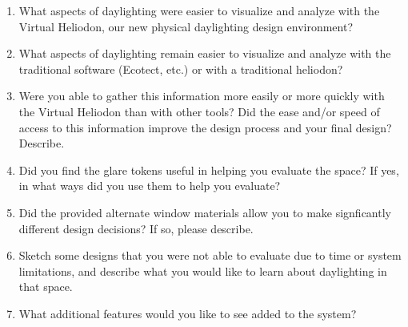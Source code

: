 \documentclass[10pt]{article}
\begin{document}
\begin{enumerate}

\item
What aspects of daylighting were easier to visualize and analyze with
the Virtual Heliodon, our new physical daylighting design environment?

\item
What aspects of daylighting remain easier to visualize and analyze
with the traditional software (Ecotect, etc.) or with a traditional
heliodon?

\item
Were you able to gather this information more easily or more quickly
with the Virtual Heliodon than with other tools?  Did the ease and/or
speed of access to this information improve the design process and
your final design?  Describe.

\item
Did you find the glare tokens useful in helping you evaluate the space?
If yes, in what ways did you use them to help you evaluate?

\item
Did the provided alternate window materials allow you to make signficantly different
design decisions?  If so, please describe.

\item
Sketch some designs that you were not able to evaluate due to time or
system limitations, and describe what you would like to learn about
daylighting in that space.

\item
What additional features would you like to see added to the system?

\end{enumerate}
\end{document}
